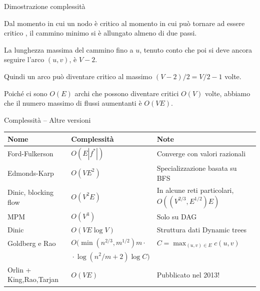 \begin{frame}{Dimostrazione complessità}

\BIL
\item Dal momento in cui un nodo è critico al momento in cui può tornare ad essere critico , il cammino minimo si è allungato almeno di due passi.
\item La lunghezza massima del cammino fino a $u$, tenuto conto che poi si deve ancora seguire l'arco $(u,v)$,
è $V-2$. 
\item Quindi un arco può diventare critico al massimo $(V-2)/2 = V/2-1$ volte. 
\item Poiché ci sono $O(E)$ archi che possono diventare critici $O(V)$ volte,
abbiamo che il numero massimo di flussi aumentanti è $O(VE)$. 
\EIL

\end{frame}


\begin{frame}{Complessità -- Altre versioni}

\small
\begin{tabular}{|P{2.6cm}|P{3.5cm}|P{4.1cm}|}
\hline
\textbf{Nome} & \textbf{Complessità} & \textbf{Note} \\\hline
Ford-Fulkerson & $O(E|f^*|)$ & Converge con valori razionali \\\hline
Edmonds-Karp & $O(VE^2)$ & Specializzazione basata su BFS \\\hline
Dinic, blocking flow & $O(V^2E)$ & In alcune reti particolari, $O((V^{2/3},E^{1/2})E)$ \\\hline
MPM & $O(V^3)$ & Solo su DAG \\\hline
Dinic & $O(VE \log V)$ & Struttura dati Dynamic trees \\\hline
Goldberg e Rao & \begingroup \footnotesize $O(\min(n^{2/3},m^{1/2})m \cdot {}$ \endgroup & $C=\max_{(u,v) \in E} c(u,v)$ \\
& \begingroup \footnotesize  ${} \cdot \log (n^2/m+2) \log C)$ \endgroup & \\\hline

Orlin + King,Rao,Tarjan & $O(VE)$ & Pubblicato nel 2013!\\\hline
\end{tabular}

\end{frame}


